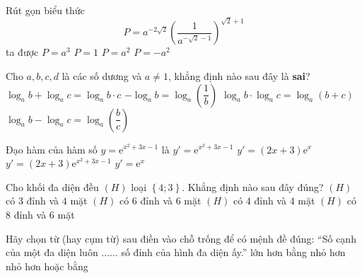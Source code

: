\begin{ex}%
Rút gọn biểu thức $$P=a^{-2\sqrt{2}}\left(\dfrac{1}{a^{-\sqrt{2}-1}}\right)^{\sqrt{2}+1}$$ ta được
\choice 
{\True $P=a^3$}
{$P=1$}
{$P=a^2$}
{$P=-a^2$}
\end{ex}
\begin{ex}%
Cho $a,b,c,d$ là các số dương và $a\neq 1$, khẳng định nào sau đây là \textbf{sai}?
\choice 
{$\log_{a}{b}+\log_{a}{c}=\log_{a}{b\cdot c}$}
{$-\log_{a}{b}=\log_{a}\left(\dfrac{1}{b}\right)$}
{\True $\log_{a}{b}\cdot \log_{a}{c}=\log_{a}\left(b+c\right)$}
{$\log_{a}{b}-\log_{a}{c}=\log_{a}\left(\dfrac{b}{c}\right)$}
\end{ex}
\begin{ex}%
Đạo hàm của hàm số $y=\mathrm{e}^{x^2+3x-1}$ là
\choice 
{$y'=\mathrm{e}^{x^2+3x-1}$}
{$y'=\left(2x+3\right)\mathrm{e}^x$}
{\True $y'=\left(2x+3\right)\mathrm{e}^{x^2+3x-1}$}
{$y'=\mathrm{e}^x$}
\end{ex}
\begin{ex}%
Cho khối đa diện đều $(H)$ loại $\left\{4;3\right\}$. Khẳng định nào sau đây đúng?
\choice
{$(H)$ có $3$ đỉnh và $4$ mặt}
{$(H)$ có $6$ đỉnh và $6$ mặt}
{$(H)$ có $4$ đỉnh và $4$ mặt}
{\True $(H)$ có $8$ đỉnh và $6$ mặt}
\end{ex}
\begin{ex}%
Hãy chọn từ (hay cụm từ) sau điền vào chỗ trống để có mệnh đề đúng: ``Số cạnh của một đa diện luôn $\ldots \ldots$ số đỉnh của hình đa diện ấy.''
\choice
{\True lớn hơn}
{bằng}
{nhỏ hơn}
{nhỏ hơn hoặc bằng}
\end{ex}
